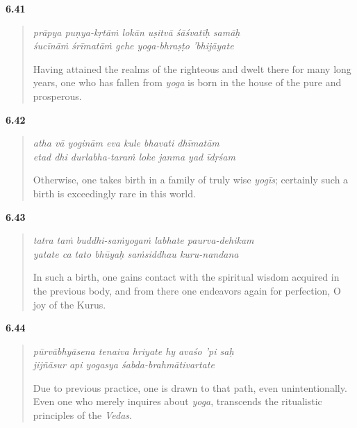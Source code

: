 \par\noindent\textbf{6.41}\par
\begin{verse}
\textit{prāpya puṇya-kṛtāṁ lokān uṣitvā śāśvatīḥ samāḥ} \\
\textit{śucīnāṁ śrīmatāṁ gehe yoga-bhraṣṭo ’bhijāyate}

\noindent Having attained the realms of the righteous and dwelt there for many long years, one who has fallen from \textit{yoga} is born in the house of the pure and prosperous.
\end{verse}
\par



\par\noindent\textbf{6.42}\par
\begin{verse}
\textit{atha vā yoginām eva kule bhavati dhīmatām} \\
\textit{etad dhi durlabha-taraṁ loke janma yad īdṛśam}

\noindent Otherwise, one takes birth in a family of truly wise \textit{yogīs}; certainly such a birth is exceedingly rare in this world.
\end{verse}
\par



\par\noindent\textbf{6.43}\par
\begin{verse}
\textit{tatra taṁ buddhi-saṁyogaṁ labhate paurva-dehikam} \\
\textit{yatate ca tato bhūyaḥ saṁsiddhau kuru-nandana}

\noindent In such a birth, one gains contact with the spiritual wisdom acquired in the previous body, and from there one endeavors again for perfection, O joy of the Kurus.
\end{verse}
\par



\par\noindent\textbf{6.44}\par
\begin{verse}
\textit{pūrvābhyāsena tenaiva hriyate hy avaśo ’pi saḥ} \\
\textit{jijñāsur api yogasya śabda-brahmātivartate}

\noindent Due to previous practice, one is drawn to that path, even unintentionally. Even one who merely inquires about \textit{yoga}, transcends the ritualistic principles of the \textit{Vedas}.
\end{verse}
\par



